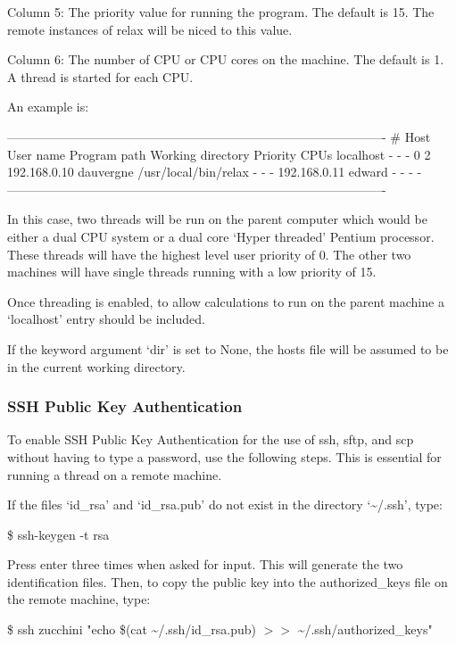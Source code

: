 Column 5:  The priority value for running the program.  The default is 15.  The remote
instances of relax will be niced to this value.

Column 6:  The number of CPU or CPU cores on the machine.  The default is 1.  A thread is
started for each CPU.

An example is:

-------------------------------------------------------------------------------------------
\# Host          User name       Program path            Working directory    Priority  CPUs
localhost       -               -                       -                    0         2
192.168.0.10    dauvergne       /usr/local/bin/relax    -                    -         -
192.168.0.11    edward          -                       -                    -         -
-------------------------------------------------------------------------------------------

In this case, two threads will be run on the parent computer which would be either a dual
CPU system or a dual core `Hyper threaded' Pentium processor.  These threads will have the
highest level user priority of 0.  The other two machines will have single threads running
with a low priority of 15.

Once threading is enabled, to allow calculations to run on the parent machine a `localhost'
entry should be included.


If the keyword argument `dir' is set to None, the hosts file will be assumed to be in the
current working directory.


\subsubsection{SSH Public Key Authentication}

To enable SSH Public Key Authentication for the use of ssh, sftp, and scp without having to
type a password, use the following steps.  This is essential for running a thread on a
remote machine.

If the files `id\_rsa' and `id\_rsa.pub' do not exist in the directory `\~{}/.ssh', type:

\$ ssh-keygen -t rsa

Press enter three times when asked for input.  This will generate the two identification
files.  Then, to copy the public key into the authorized\_keys file on the remote machine,
type:

\$ ssh zucchini "echo \$(cat \~{}/.ssh/id\_rsa.pub) $>>$ \~{}/.ssh/authorized\_keys"

